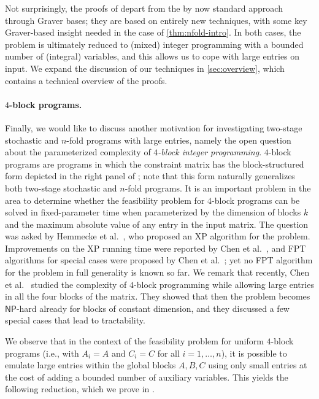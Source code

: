 \documentclass{theoretics}
\begin{document}
Not surprisingly, the proofs of  depart from the by now standard approach through Graver bases; they are based on entirely new techniques, with some key Graver-based insight needed in the case of \cref{thm:nfold-intro}. In both cases, the problem is ultimately reduced to (mixed) integer programming with a bounded number of (integral) variables, and this allows us to cope with large entries on input. We expand the discussion of our techniques in \cref{sec:overview}, which contains a technical overview of the proofs.


\paragraph*{$4$-block programs.} Finally, we would like to discuss another motivation for investigating two-stage stochastic and $n$-fold programs with large entries, namely the open question about the parameterized complexity of {\em{$4$-block integer programming}}. $4$-block programs are programs in which the constraint matrix has the block-structured form depicted in the right panel of ; note that this form naturally generalizes both two-stage stochastic and $n$-fold programs. It is an important problem in the area to determine whether the feasibility problem for $4$-block programs can be solved in fixed-parameter time when parameterized by the dimension of blocks $k$ and the maximum absolute value of any entry in the input matrix. The question was asked by Hemmecke et al.~\cite{HemmeckeKW14}, who proposed an XP algorithm for the problem. Improvements on the XP running time were reported by Chen et al.~\cite{ChenKXS20}, and FPT algorithms for special cases were proposed by Chen et al.~\cite{ChenCZ21}; yet no FPT algorithm for the problem in full generality is known so far. We remark that recently, Chen et al.~\cite{ChenCZ22} studied the complexity of $4$-block programming while allowing large entries in all the four blocks of the matrix. They showed that then the problem becomes $\mathsf{NP}$-hard already for blocks of constant dimension, and they discussed a few special cases that lead to tractability.

We observe that in the context of the feasibility problem for uniform $4$-block programs (i.e., with $A_i=A$ and $C_i=C$ for all $i=1,\ldots,n$), it is possible to emulate large entries within the global blocks $A,B,C$ using only small entries at the cost of adding a bounded number of auxiliary variables. This yields the following reduction, which we prove in .
\end{document}
